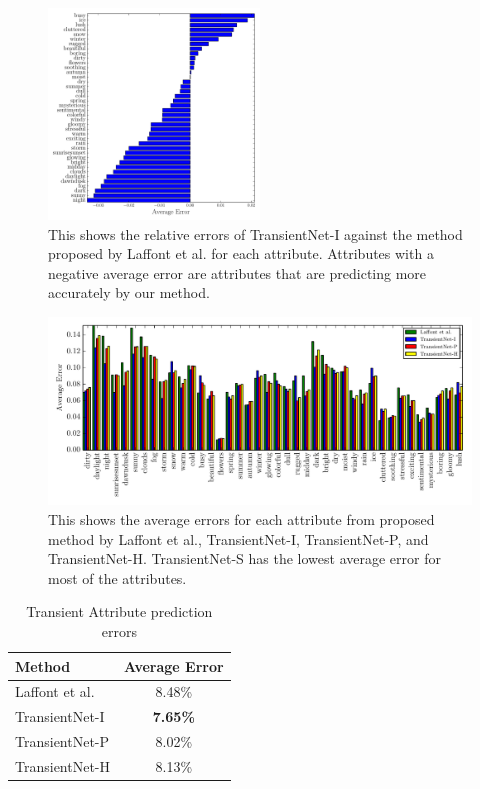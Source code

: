 \documentclass{article}
\begin{document}
\begin{figure}[t]
	\centering
		\includegraphics[width=0.5\textwidth]{figs/rel_err_cmr.pdf}
		\caption{This shows the relative errors of TransientNet-I against the method 
						 proposed by Laffont et al. for each attribute.  Attributes with a 
						 negative average error are attributes that are predicting more 
						 accurately by our method.}
		\label{fig:relerr}
\end{figure}

\begin{figure}[t]
	\centering
		\includegraphics[width=1.0\textwidth]{figs/avg_err_compare_cmr.pdf}
		\caption{This shows the average errors for each attribute from proposed method
						 by Laffont et al., TransientNet-I, TransientNet-P, and TransientNet-H.  
             TransientNet-S has the lowest average error for most of the attributes.}
		\label{fig:compare}
\end{figure}

\begin{table}[t]
	\centering
	\begin{tabular}{ | l | c | }
		\hline
			Method & Average Error \\ \hline
			Laffont et al.~\cite{Laffont14}& 8.48\% \\ \hline
			TransientNet-I & \textbf{7.65\%} \\ \hline
			TransientNet-P & 8.02\% \\ \hline
			TransientNet-H & 8.13\% \\ 
		\hline
	\end{tabular}
	\caption{Transient Attribute prediction errors}
	\label{tbl:transient}
\end{table}
\end{document}
